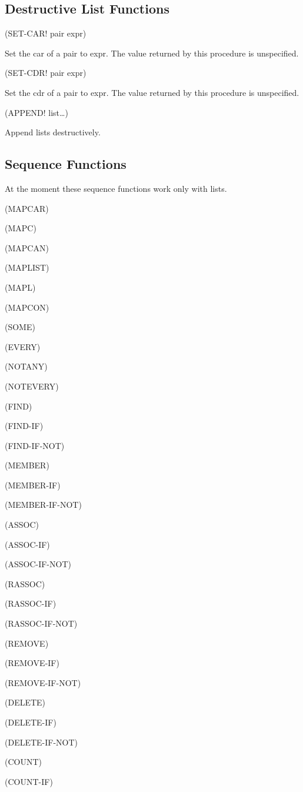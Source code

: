\documentclass[11pt]{article}
\begin{document}
\subsection{Destructive List Functions}
\label{sec-1-16}

(SET-CAR! pair expr)

Set the car of a pair to expr. The value returned by this procedure is
unspecified.

(SET-CDR! pair expr)

Set the cdr of a pair to expr. The value returned by this procedure is
unspecified.

(APPEND!  list\ldots{})

Append lists destructively.
\subsection{Sequence Functions}
\label{sec-1-17}

At the moment these sequence functions work only with lists.

(MAPCAR)

(MAPC)

(MAPCAN)

(MAPLIST)

(MAPL)

(MAPCON)

(SOME)

(EVERY)

(NOTANY)

(NOTEVERY)

(FIND)

(FIND-IF)

(FIND-IF-NOT)

(MEMBER)

(MEMBER-IF)

(MEMBER-IF-NOT)

(ASSOC)

(ASSOC-IF)

(ASSOC-IF-NOT)

(RASSOC)

(RASSOC-IF)

(RASSOC-IF-NOT)

(REMOVE)

(REMOVE-IF)

(REMOVE-IF-NOT)

(DELETE)

(DELETE-IF)

(DELETE-IF-NOT)

(COUNT)

(COUNT-IF)
\end{document}
